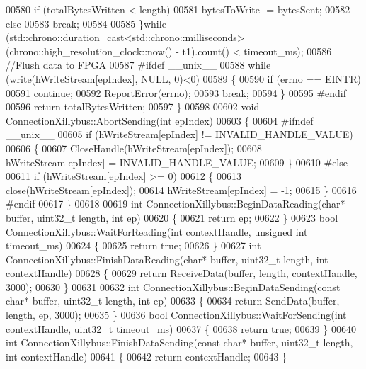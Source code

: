 \begin{DoxyCode}
00580         \textcolor{keywordflow}{if} (totalBytesWritten < length)
00581             bytesToWrite -= bytesSent;
00582         \textcolor{keywordflow}{else}
00583             \textcolor{keywordflow}{break};
00584 
00585     \}\textcolor{keywordflow}{while} (std::chrono::duration\_cast<std::chrono::milliseconds>(chrono::high\_resolution\_clock::now() - 
      t1).count() < timeout\_ms);
00586     \textcolor{comment}{//Flush data to FPGA}
00587 \textcolor{preprocessor}{#ifdef \_\_unix\_\_}
00588     \textcolor{keywordflow}{while} (write(hWriteStream[epIndex], NULL, 0)<0)
00589     \{
00590         \textcolor{keywordflow}{if} (errno == EINTR)
00591             \textcolor{keywordflow}{continue};
00592         ReportError(errno);
00593         \textcolor{keywordflow}{break};
00594     \}
00595 \textcolor{preprocessor}{#endif}
00596     \textcolor{keywordflow}{return} totalBytesWritten;
00597 \}
00598 
00602 \textcolor{keywordtype}{void} ConnectionXillybus::AbortSending(\textcolor{keywordtype}{int} epIndex)
00603 \{
00604 \textcolor{preprocessor}{#ifndef \_\_unix\_\_}
00605     \textcolor{keywordflow}{if} (hWriteStream[epIndex] != INVALID\_HANDLE\_VALUE)
00606     \{
00607         CloseHandle(hWriteStream[epIndex]);
00608         hWriteStream[epIndex] = INVALID\_HANDLE\_VALUE;
00609     \}
00610 \textcolor{preprocessor}{#else}
00611     \textcolor{keywordflow}{if} (hWriteStream[epIndex] >= 0)
00612     \{
00613         close(hWriteStream[epIndex]);
00614         hWriteStream[epIndex] = -1;
00615     \}
00616 \textcolor{preprocessor}{#endif}
00617 \}
00618 
00619 \textcolor{keywordtype}{int} ConnectionXillybus::BeginDataReading(\textcolor{keywordtype}{char}* buffer, uint32\_t length, \textcolor{keywordtype}{int} ep) 
00620 \{
00621     \textcolor{keywordflow}{return} ep;
00622 \}
00623 \textcolor{keywordtype}{bool} ConnectionXillybus::WaitForReading(\textcolor{keywordtype}{int} contextHandle, \textcolor{keywordtype}{unsigned} \textcolor{keywordtype}{int} 
      timeout_ms) 
00624 \{
00625     \textcolor{keywordflow}{return} \textcolor{keyword}{true};
00626 \}
00627 \textcolor{keywordtype}{int} ConnectionXillybus::FinishDataReading(\textcolor{keywordtype}{char}* buffer, uint32\_t length, \textcolor{keywordtype}{int} contextHandle)
00628 \{
00629     \textcolor{keywordflow}{return} ReceiveData(buffer, length, contextHandle, 3000);
00630 \}
00631 
00632 \textcolor{keywordtype}{int} ConnectionXillybus::BeginDataSending(\textcolor{keyword}{const} \textcolor{keywordtype}{char}* buffer, uint32\_t length, \textcolor{keywordtype}{int} ep) 
00633 \{
00634     \textcolor{keywordflow}{return} SendData(buffer, length,  ep, 3000);
00635 \}
00636 \textcolor{keywordtype}{bool} ConnectionXillybus::WaitForSending(\textcolor{keywordtype}{int} contextHandle, uint32\_t timeout_ms) 
00637 \{
00638     \textcolor{keywordflow}{return} \textcolor{keyword}{true};
00639 \}
00640 \textcolor{keywordtype}{int} ConnectionXillybus::FinishDataSending(\textcolor{keyword}{const} \textcolor{keywordtype}{char}* buffer, uint32\_t length, \textcolor{keywordtype}{int} contextHandle) 
00641 \{
00642     \textcolor{keywordflow}{return} contextHandle;
00643 \}
\end{DoxyCode}
